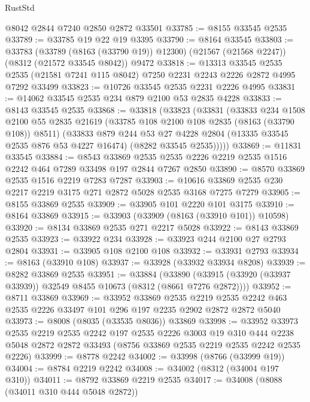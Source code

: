 \begin{lexlean}{RustStd}
\begin{coremodule}
    @8042
    @2844
    @7240
    @2850
    @2872
    @33501
@33785 := @8155 @33545 @2535
@33789 := @33785 @19 @22 @19 @3395
@33790 := @8164 @33545
@33803 := @33783
    (@33789 (@8163 (@33790 @19)) @12300)
    (@21567 (@21568 @2247))
    (@8312 (@21572 @33545 @8042))
    @9472
@33818 := @13313
    @33545
    @2535
    @2535
    (@21581 @7241 @115 @8042)
    @7250
    @2231
    @2243
    @2226
    @2872
    @4995
    @7292
    @33499
@33823 := @10726 @33545 @2535 @2231 @2226 @4995
@33831 := @14062 @33545 @2535 @234 @879 @2100 @53 @2835 @4228
@33833 := @8143 @33545 @2535
@33868 := @33818
    (@33823
      (@33831
        (@33833
          @234
          @1508
          @2100
          @55
          @2835
          @21619
          (@33785 @108 @2100 @108 @2835 (@8163 (@33790 @108)) @8511)
          (@33833
            @879
            @244
            @53
            @27
            @4228
            @2804
            (@13335 @33545 @2535 @876 @53 @4227 @16474)
            (@8282 @33545 @2535)))))
@33869 := @11831 @33545
@33884 := @8543
    @33869
    @2535
    @2535
    @2226
    @2219
    @2535
    @1516
    @2242
    @464
    @7289
    @33498
    @197
    @2844
    @7267
    @2850
@33890 := @8570 @33869 @2535 @1516 @2219 @7283 @7287
@33903 := @10616 @33869 @2535 @230 @2217 @2219 @3175 @271 @2872 @5028 @2535 @3168 @7275 @7279
@33905 := @8155 @33869 @2535
@33909 := @33905 @101 @2220 @101 @3175
@33910 := @8164 @33869
@33915 := @33903 (@33909 (@8163 (@33910 @101)) @10598)
@33920 := @8134 @33869 @2535 @271 @2217 @5028
@33922 := @8143 @33869 @2535
@33923 := @33922 @234
@33928 := @33923 @244 @2100 @27 @2793 @2804
@33931 := @33905 @108 @2100 @108
@33932 := @33931 @2793
@33934 := @8163 (@33910 @108)
@33937 := @33928 (@33932 @33934 @8208)
@33939 := @8282 @33869 @2535
@33951 := @33884
    (@33890 (@33915 (@33920 (@33937 @33939)) @32549 @8455 @10673 (@8312 (@8661 @7276 @2872))))
@33952 := @8711 @33869
@33969 := @33952
    @33869
    @2535
    @2219
    @2535
    @2242
    @463
    @2535
    @2226
    @33497
    @101
    @296
    @197
    @2235
    @2902
    @2872
    @2872
    @5040
@33973 := @8008 (@8035 (@33535 @8036)) @33869
@33998 := @33952
    @33973
    @2535
    @2219
    @2535
    @2242
    @197
    @2535
    @2226
    @3003
    @19
    @310
    @444
    @2238
    @5048
    @2872
    @2872
    @33493
    (@8756 @33869 @2535 @2219 @2535 @2242 @2535 @2226)
@33999 := @8778 @2242
@34002 := @33998 (@8766 (@33999 @19))
@34004 := @8784 @2219 @2242
@34008 := @34002 (@8312 (@34004 @197 @310))
@34011 := @8792 @33869 @2219 @2535
@34017 := @34008 (@8088 (@34011 @310 @444 @5048 @2872))

\end{coremodule}
\end{lexlean}
